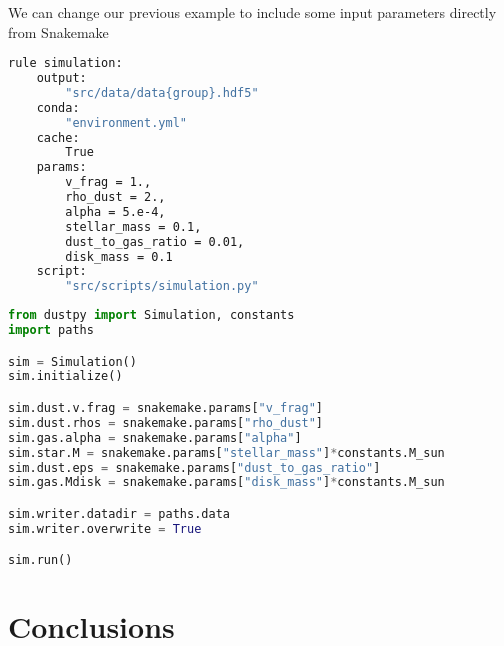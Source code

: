 \documentclass{aa}
\begin{document}
We can change our previous example to include some input parameters directly from Snakemake
\begin{lstlisting}[language=bash, caption=Snakemake DustPy]
rule simulation:
    output:
        "src/data/data{group}.hdf5"
    conda:
        "environment.yml"
    cache:
        True
    params:
        v_frag = 1.,
        rho_dust = 2.,
        alpha = 5.e-4,
        stellar_mass = 0.1,
        dust_to_gas_ratio = 0.01,
        disk_mass = 0.1
    script:
        "src/scripts/simulation.py"
\end{lstlisting}
\begin{lstlisting}[language=python, caption=simulations.py]
from dustpy import Simulation, constants
import paths

sim = Simulation()
sim.initialize()

sim.dust.v.frag = snakemake.params["v_frag"]
sim.dust.rhos = snakemake.params["rho_dust"]
sim.gas.alpha = snakemake.params["alpha"]
sim.star.M = snakemake.params["stellar_mass"]*constants.M_sun
sim.dust.eps = snakemake.params["dust_to_gas_ratio"]
sim.gas.Mdisk = snakemake.params["disk_mass"]*constants.M_sun

sim.writer.datadir = paths.data
sim.writer.overwrite = True

sim.run()
\end{lstlisting}

\section{Conclusions}

\begin{acknowledgements}
\end{acknowledgements}

\end{document}
